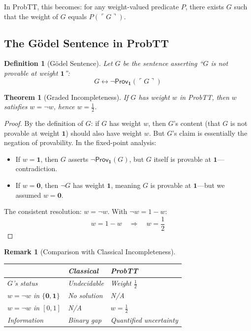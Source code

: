 \documentclass[11pt,a4paper]{article}
\newtheorem{definition}{Definition}[section]
\newtheorem{remark}{Remark}[section]
\newtheorem{theorem}{Theorem}[section]
\newcommand{\one}{\mathbf{1}}
\newcommand{\zero}{\mathbf{0}}
\newcommand{\negw}{\neg}
\begin{document}
In ProbTT, this becomes: for any weight-valued predicate $P$, there exists $G$ such that the weight of $G$ equals $P(\ulcorner G \urcorner)$.

\subsection{The G\"odel Sentence in ProbTT}

\begin{definition}[G\"odel Sentence]
Let $G$ be the sentence asserting ``$G$ is not provable at weight $\one$'':
\[
G \leftrightarrow \neg \mathsf{Prov}_\one(\ulcorner G \urcorner)
\]
\end{definition}

\begin{theorem}[Graded Incompleteness]
If $G$ has weight $w$ in ProbTT, then $w$ satisfies $w = \negw w$, hence $w = \frac{1}{2}$.
\end{theorem}

\begin{proof}
By the definition of $G$: if $G$ has weight $w$, then $G$'s content (that $G$ is not provable at weight $\one$) should also have weight $w$. But $G$'s claim is essentially the negation of provability. In the fixed-point analysis:
\begin{itemize}
    \item If $w = \one$, then $G$ asserts $\neg\mathsf{Prov}_\one(G)$, but $G$ itself is provable at $\one$---contradiction.
    \item If $w = \zero$, then $\neg G$ has weight $\one$, meaning $G$ is provable at $\one$---but we assumed $w = \zero$.
\end{itemize}
The consistent resolution: $w = \negw w$. With $\negw w = 1 - w$:
\[
w = 1 - w \quad \Rightarrow \quad w = \frac{1}{2}
\]
\end{proof}

\begin{remark}[Comparison with Classical Incompleteness]
\begin{center}
\begin{tabular}{l|l|l}
& \textbf{Classical} & \textbf{ProbTT} \\
\hline
$G$'s status & Undecidable & Weight $\frac{1}{2}$ \\
$w = \negw w$ in $\{\zero, \one\}$ & No solution & N/A \\
$w = \negw w$ in $[0,1]$ & N/A & $w = \frac{1}{2}$ \\
Information & Binary gap & Quantified uncertainty \\
\end{tabular}
\end{center}
\end{remark}
\end{document}
